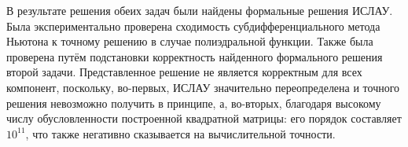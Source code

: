 В результате решения обеих задач были найдены формальные решения ИСЛАУ. Была экспериментально проверена сходимость субдифференциального метода Ньютона к точному решению в случае полиэдральной функции. Также была проверена путём подстановки корректность найденного формального решения второй задачи. Представленное решение не является корректным для всех компонент, поскольку, во-первых, ИСЛАУ значительно переопределена и точного решения невозможно получить в принципе, а, во-вторых, благодаря высокому числу обусловленности построенной квадратной матрицы: его порядок составляет $10^{11}$, что также негативно сказывается на вычислительной точности.
